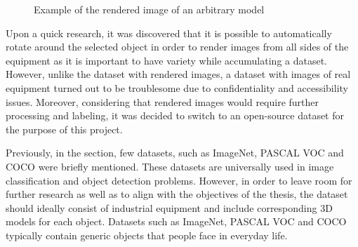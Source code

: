 \documentclass[english, 12pt, a4paper, elec, utf8, a-1b, online]{aaltothesis}
\begin{document}
\begin{figure}[htb]
    \centering
    \qquad
    \caption{Example of the rendered image of an arbitrary model}
    \label{navisworks}%
\end{figure}
\FloatBarrier

Upon a quick research, it was discovered that it is possible to automatically rotate around the selected object in order to render images from all sides of the equipment as it is important to have variety while accumulating a dataset. However, unlike the dataset with rendered images, a dataset with images of real equipment turned out to be troublesome due to confidentiality and accessibility issues. Moreover, considering that rendered images would require further processing and labeling, it was decided to switch to an open-source dataset for the purpose of this project. 

Previously, in the  section, few datasets, such as ImageNet\cite{Russakovsky2014}, PASCAL VOC\cite{Everingham10} and COCO \cite{Lin2014} were briefly mentioned. These datasets are universally used in image classification and object detection problems. However, in order to leave room for further research as well as to align with the objectives of the thesis, the dataset should ideally consist of industrial equipment and include corresponding 3D models for each object. Datasets such as ImageNet, PASCAL VOC and COCO typically contain generic objects that people face in everyday life. 
\end{document}
